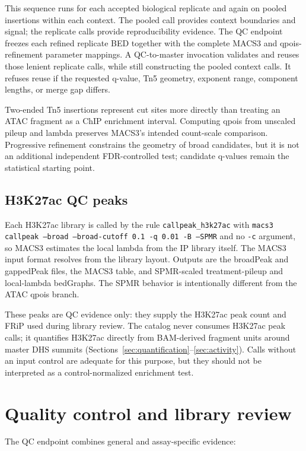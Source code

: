 \documentclass[11pt]{article}
\begin{document}
This sequence runs for each accepted biological replicate and again on pooled
insertions within each context.  The pooled call provides context boundaries
and signal; the replicate calls provide reproducibility evidence.
The QC endpoint freezes each refined replicate BED together with the complete
MACS3 and qpois-refinement parameter mappings.  A QC-to-master invocation
validates and reuses those lenient replicate calls, while still constructing
the pooled context calls.  It refuses reuse if the requested q-value, Tn5
geometry, exponent range, component lengths, or merge gap differs.

Two-ended Tn5 insertions represent cut sites more directly than treating an
ATAC fragment as a ChIP enrichment interval.  Computing qpois from unscaled
pileup and lambda preserves MACS3's intended count-scale comparison.
Progressive refinement constrains the geometry of broad candidates, but it is
not an additional independent FDR-controlled test; candidate q-values remain
the statistical starting point.

\subsection{H3K27ac QC peaks}

Each H3K27ac library is called by the rule \texttt{callpeak\_h3k27ac} with
\texttt{macs3 callpeak --broad --broad-cutoff 0.1 -q 0.01 -B --SPMR} and no
\texttt{-c} argument, so MACS3 estimates the local lambda from the IP library
itself.  The MACS3 input format resolves from the library layout.  Outputs are
the broadPeak and gappedPeak files, the MACS3 table, and SPMR-scaled
treatment-pileup and local-lambda bedGraphs.  The SPMR behavior is
intentionally different from the ATAC qpois branch.

These peaks are QC evidence only: they supply the H3K27ac peak count and FRiP
used during library review.  The catalog never consumes H3K27ac peak calls;
it quantifies H3K27ac directly from BAM-derived fragment units around master
DHS summits (Sections~\ref{sec:quantification}--\ref{sec:activity}).  Calls
without an input control are adequate for this purpose, but they should not be
interpreted as a control-normalized enrichment test.

\section{Quality control and library review}

The QC endpoint combines general and assay-specific evidence:
\end{document}
